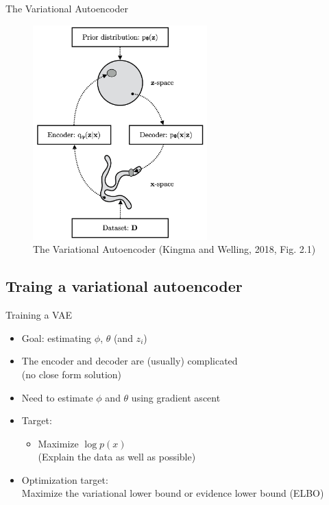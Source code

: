 \documentclass[10pt]{beamer}
\begin{document}
\begin{frame}{The Variational Autoencoder}

\begin{figure}[h]
\centering
\includegraphics[width=0.6\textwidth]{fig/Kingma_Welling_2018_Fig_2_1.png}
\caption{The Variational Autoencoder (Kingma and Welling, 2018, Fig. 2.1)}
\end{figure}
\end{frame}

\subsection{Traing a variational autoencoder}

\begin{frame}{Training a VAE}
\begin{itemize}
\item {\color{uured} Goal}: estimating $\phi$, $\theta$ (and $z_i$)
\item The encoder and decoder are (usually) complicated \\ (no close form solution)
\item Need to estimate $\phi$ and $\theta$ using gradient ascent
\item Target:
\begin{itemize}
\item Maximize $\log p(x)$\\(Explain the data as well as possible)
\end{itemize}\pause
\item Optimization target: \\Maximize the variational lower bound or {\color{uured} evidence lower bound (ELBO)}
\end{itemize}
\end{frame}
\end{document}
